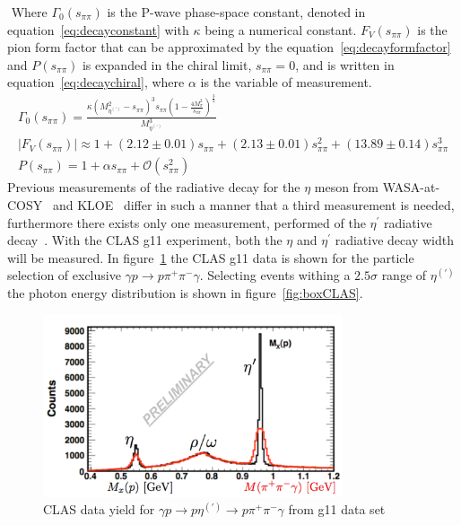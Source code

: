 \documentclass{aip-cp}
\begin{document}
 Where $\Gamma_0(s_{\pi\pi})$ is the P-wave phase-space constant, denoted in equation~\ref{eq:decayconstant} with $\kappa$ being a numerical constant. $F_V(s_{\pi\pi})$ is the pion form factor that can be approximated by the equation~\ref{eq:decayformfactor} and  $P(s_{\pi\pi})$ is expanded in the chiral limit, $s_{\pi\pi} = 0$, and is written in equation~\ref{eq:decaychiral}, where $\alpha$ is the variable of measurement.
\begin{eqnarray}
\Gamma_0(s_{\pi\pi}) = \frac{\kappa \left(M^2_{\eta^{(\prime)}} - s_{\pi\pi} \right)^3  s_{\pi\pi} \left(1- \frac{ 4M^2_{\pi }}{    s_{\pi\pi}  }\right)^{\frac{3}{2}}   }{M^3_{\eta^{(\prime)} }}  \label{eq:decayconstant}  \\
\vert F_V(s_{\pi\pi}) \vert \approx 1+(2.12\pm0.01)s_{\pi\pi} + (2.13\pm0.01)s_{\pi\pi}^2+(13.89\pm0.14)s_{\pi\pi}^3 \label{eq:decayformfactor} \\
P(s_{\pi\pi}) = 1 + \alpha s_{\pi\pi} + \mathcal{O}(s_{\pi\pi}^2) \label{eq:decaychiral}
\end{eqnarray}
Previous measurements of the radiative decay for the $\eta$ meson from WASA-at-COSY~\cite{bib0} and KLOE~\cite{bib3} differ in such a manner that a third measurement is needed, furthermore there exists only one measurement, performed  of the $\eta^{\prime}$ radiative decay~\cite{bib2}. With the CLAS g11 experiment, both the $\eta$ and  $\eta^{\prime}$ radiative decay width will be measured. In figure~\ref{fig:boxCLASdata} the CLAS g11 data is shown for the particle selection of exclusive $\gamma p \to p  \pi^+ \pi^- \gamma $. Selecting events withing a $2.5 \sigma$ range of $\eta^{(\prime)}$ the photon energy distribution is shown in figure~\ref{fig:boxCLAS}. 
\begin{figure}[h]
	\centerline{\includegraphics[width=250pt]{figures/clas_g11data.pdf}}
	\caption{CLAS data yield for $\gamma p \to p \eta^{(\prime)} \to p \pi^+ \pi^- \gamma $ from g11 data set }
	\label{fig:boxCLASdata}
\end{figure}
\end{document}
